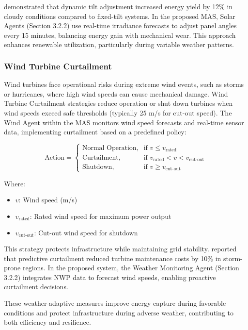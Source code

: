 \documentclass[12pt]{article}
\begin{document}
\citet{chen2022} demonstrated that dynamic tilt adjustment increased energy yield by 12\% in cloudy conditions compared to fixed-tilt systems. In the proposed MAS, Solar Agents (Section 3.2.2) use real-time irradiance forecasts to adjust panel angles every 15 minutes, balancing energy gain with mechanical wear. This approach enhances renewable utilization, particularly during variable weather patterns.

\subsubsection{Wind Turbine Curtailment}

Wind turbines face operational risks during extreme wind events, such as storms or hurricanes, where high wind speeds can cause mechanical damage. Wind Turbine Curtailment strategies reduce operation or shut down turbines when wind speeds exceed safe thresholds (typically 25 m/s for cut-out speed). The Wind Agent within the MAS monitors wind speed forecasts and real-time sensor data, implementing curtailment based on a predefined policy:

\[
\text{Action} = 
\begin{cases} 
\text{Normal Operation}, & \text{if } v \leq v_{\text{rated}} \\
\text{Curtailment}, & \text{if } v_{\text{rated}} < v < v_{\text{cut-out}} \\
\text{Shutdown}, & \text{if } v \geq v_{\text{cut-out}}
\end{cases}
\]

Where:
\begin{itemize}
    \item \( v \): Wind speed (m/s)
    \item \( v_{\text{rated}} \): Rated wind speed for maximum power output
    \item \( v_{\text{cut-out}} \): Cut-out wind speed for shutdown
\end{itemize}

This strategy protects infrastructure while maintaining grid stability. \citet{lee2023} reported that predictive curtailment reduced turbine maintenance costs by 10\% in storm-prone regions. In the proposed system, the Weather Monitoring Agent (Section 3.2.2) integrates NWP data to forecast wind speeds, enabling proactive curtailment decisions.

These weather-adaptive measures improve energy capture during favorable conditions and protect infrastructure during adverse weather, contributing to both efficiency and resilience.
\end{document}
